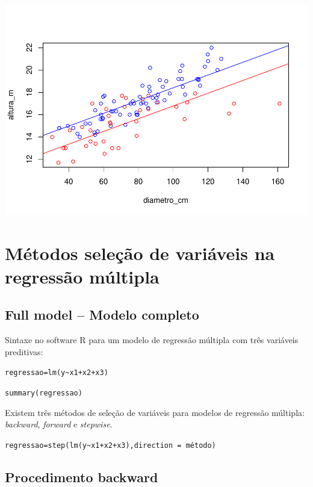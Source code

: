 \documentclass[12pt,brazil,]{book}
\begin{document}
\includegraphics{04-RegMult_files/figure-latex/unnamed-chunk-4-2.pdf}

\hypertarget{metodos-selecao-de-variaveis-na-regressao-multipla}{%
\section{Métodos seleção de variáveis na regressão
múltipla}\label{metodos-selecao-de-variaveis-na-regressao-multipla}}

\hypertarget{full-model-modelo-completo}{%
\subsection{Full model -- Modelo
completo}\label{full-model-modelo-completo}}

Sintaxe no software R para um modelo de regressão múltipla com três
variáveis preditivas:

\texttt{regressao=lm(y\textasciitilde{}x1+x2+x3)}

\texttt{summary(regressao)}

Existem três métodos de seleção de variáveis para modelos de regressão
múltipla: \emph{backward}, \emph{forward} e \emph{stepwise}.

\texttt{regressao=step(lm(y\textasciitilde{}x1+x2+x3),direction\ =\ \textquotesingle{}método\textquotesingle{})}

\hypertarget{procedimento-backward}{%
\subsection{Procedimento backward}\label{procedimento-backward}}
\end{document}
